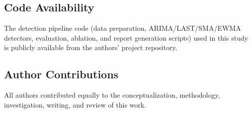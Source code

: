 \documentclass[pdflatex,sn-nature]{sn-jnl}%
\theoremstyle{thmstyleone}%
\theoremstyle{thmstyletwo}%
\theoremstyle{thmstylethree}%
\begin{document}
\subsection*{Code Availability}
The detection pipeline code (data preparation, ARIMA/LAST/SMA/EWMA detectors, evaluation, ablation, and report generation scripts) used in this study is publicly available from the authors' project repository.

\subsection*{Author Contributions}
All authors contributed equally to the conceptualization, methodology, investigation, writing, and review of this work.






\end{document}

